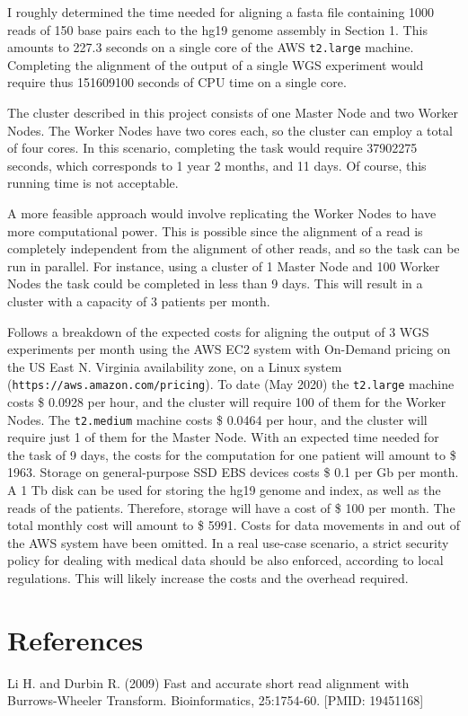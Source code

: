 \documentclass{article}
\begin{document}
I roughly determined the time needed for aligning a fasta file containing 1000 reads of 150 base pairs each to the hg19 genome assembly in Section 1.
This amounts to 227.3 seconds on a single core of the AWS \texttt{t2.large} machine.
Completing the alignment of the output of a single WGS experiment would require thus 151609100 seconds of CPU time on a single core.

The cluster described in this project consists of one Master Node and two Worker Nodes.
The Worker Nodes have two cores each, so the cluster can employ a total of four cores.
In this scenario, completing the task would require 37902275 seconds, which corresponds to 1 year 2 months, and 11 days.
Of course, this running time is not acceptable.

A more feasible approach would involve replicating the Worker Nodes to have more computational power.
This is possible since the alignment of a read is completely independent from the alignment of other reads, and so the task can be run in parallel.
For instance, using a cluster of 1 Master Node and 100 Worker Nodes the task could be completed in less than 9 days.
This will result in a cluster with a capacity of 3 patients per month.

Follows a breakdown of the expected costs for aligning the output of 3 WGS experiments per month using the AWS EC2 system with On-Demand pricing on the US East N. Virginia availability zone, on a Linux system (\texttt{https://aws.amazon.com/pricing}).
To date (May 2020) the \texttt{t2.large} machine costs \$ 0.0928 per hour, and the cluster will require 100 of them for the Worker Nodes.
The \texttt{t2.medium} machine costs \$ 0.0464 per hour, and the cluster will require just 1 of them for the Master Node.
With an expected time needed for the task of 9 days, the costs for the computation for one patient will amount to \$ 1963.
Storage on general-purpose SSD EBS devices costs \$ 0.1 per Gb per month.
A 1 Tb disk can be used for storing the hg19 genome and index, as well as the reads of the patients.
Therefore, storage will have a cost of \$ 100 per month.
The total monthly cost will amount to \$ 5991.
Costs for data movements in and out of the AWS system have been omitted.
In a real use-case scenario, a strict security policy for dealing with medical data should be also enforced, according to local regulations.
This will likely increase the costs and the overhead required.

\section{References}
Li H. and Durbin R. (2009) Fast and accurate short read alignment with Burrows-Wheeler Transform. Bioinformatics, 25:1754-60. [PMID: 19451168]\\
\end{document}

